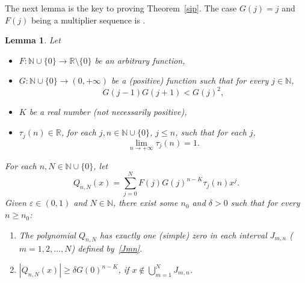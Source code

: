 \documentclass[10pt, a4paper, leqno]{amsart}
\numberwithin{equation}{section}
\theoremstyle{plain}
\newtheorem{Lem}[Theo]{Lemma}
\theoremstyle{remark}
\newcommand{\RR}{\mathbb{R}}
\newcommand{\NN}{\mathbb{N}}
\newcommand{\eps}{\varepsilon}
\begin{document}
The next lemma is the key to proving Theorem~\ref{sip}. The case $G(j)=j$ and $F(j)$ being a multiplier sequence is \cite[Lemma 6]{dzb}.

\begin{Lem}
\label{lemaQn>d}
Let
\begin{itemize}
\item $F : \NN \cup \{0\} \to \RR \setminus \{0\}$ be an arbitrary function,

\item $G : \NN \cup \{0\} \to (0,+\infty)$ be a (positive) function such that for every $j \in \NN$,
\[
  G(j-1) G(j+1) < G(j)^2,
\]

\item $K$ be a real number (not necessarily positive),

\item $\tau_j(n) \in \RR$, for each $j, n \in \NN \cup \{0\}$, $j \le n$, such that for each $j$,
\[
  \lim_{n \to +\infty} \tau_j(n) = 1.
\]
\end{itemize}
For each $n, N \in \NN \cup \{0\}$, let
\[
  Q_{n,N}(x) = \sum_{j=0}^N F(j) G(j)^{n-K} \tau_j(n) x^j.
\]
Given $\eps \in (0,1)$ and $N \in \NN$, there exist some $n_0$ and $\delta > 0$ such that for every $n \ge n_0$:
\begin{enumerate}
\item
The polynomial $Q_{n,N}$ has exactly one (simple) zero in each interval $J_{m,n}$ ($m=1,2,\dots,N$) defined by~\eqref{Jmn}.

\item
$|Q_{n,N}(x)| \ge \delta G(0)^{n-K}$, if $x \notin \bigcup_{m=1}^N J_{m,n}$.
\end{enumerate}
\end{Lem}
\end{document}
